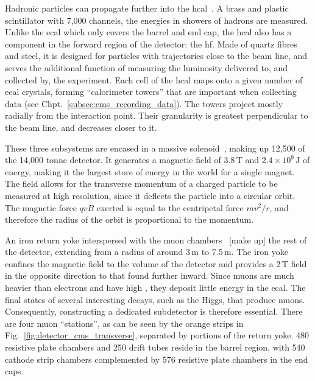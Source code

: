 Hadronic particles can propagate further into the \acrshort{hcal}~\cite{CERN-LHCC-97-031}. A brass and plastic scintillator with 7,000 channels, the energies in showers of hadrons are measured. Unlike the \acrshort{ecal} which only covers the barrel and end cap, the \acrshort{hcal} also has a component in the forward region of the detector: the \acrfull{hf}. Made of quartz fibres and steel, it is designed for particles with trajectories close to the beam line, and serves the additional function of measuring the luminosity delivered to, and collected by, the experiment. Each cell of the \acrshort{hcal} maps onto a given number of \acrshort{ecal} crystals, forming ``calorimeter towers'' that are important when collecting data (see Chpt.~\ref{subsec:cms_recording_data}). The towers project mostly radially from the interaction point. Their granularity is greatest perpendicular to the beam line, and decreases closer to it. %

These three subsystems are encased in a massive solenoid~\cite{CERN-LHCC-97-010}, making up 12,500 of the 14,000 tonne detector. It generates a magnetic field of 3.8\,T and $\text{2.4} \times \text{10}^{\text{9}}$\,J of energy, making it the largest store of energy in the world for a single magnet. The field allows for the transverse momentum of a charged particle to be measured at high resolution, since it deflects the particle into a circular orbit. The magnetic force $qvB$ exerted is equal to the centripetal force $mv^2/r$, and therefore the radius of the orbit is proportional to the momentum.

An iron return yoke interspersed with the muon chambers~\cite{Layter:343814} [make up] the rest of the detector, extending from a radius of around 3\,m to 7.5\,m. The iron yoke confines the magnetic field to the volume of the detector and provides a 2\,T field in the opposite direction to that found further inward. Since muons are much heavier than electrons and have high \pt, they deposit little energy in the \acrshort{ecal}. The final states of several interesting decays, such as the Higgs, that produce muons. Consequently, constructing a dedicated subdetector is therefore essential. There are four muon ``stations'', as can be seen by the orange strips in Fig.~\ref{fig:detector_cms_transverse}, separated by portions of the return yoke. 480 resistive plate chambers and 250 drift tubes reside in the barrel region, with 540 cathode strip chambers complemented by 576 resistive plate chambers in the end caps. %


